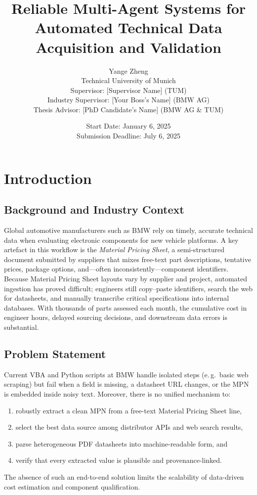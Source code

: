 \documentclass[11pt]{article}
\title{\textbf{Reliable Multi-Agent Systems for Automated Technical Data Acquisition and Validation}}
\author{
  Yange Zheng \\
  Technical University of Munich \\
  Supervisor: [Supervisor Name] (TUM) \\
  Industry Supervisor: [Your Boss's Name] (BMW AG) \\
  Thesis Advisor: [PhD Candidate's Name] (BMW AG \& TUM)
}
\date{Start Date: January 6, 2025 \\
Submission Deadline: July 6, 2025}
\begin{document}
\maketitle

\tableofcontents
\newpage

\section{Introduction}

\subsection{Background and Industry Context}
Global automotive manufacturers such as BMW rely on timely, accurate technical data when evaluating electronic components for new vehicle platforms.  
A key artefact in this workflow is the \emph{Material Pricing Sheet}, a semi-structured document submitted by suppliers that mixes free-text part descriptions, tentative prices, package options, and—often inconsistently—component identifiers.  
Because Material Pricing Sheet layouts vary by supplier and project, automated ingestion has proved difficult; engineers still copy–paste identifiers, search the web for datasheets, and manually transcribe critical specifications into internal databases.  
With thousands of parts assessed each month, the cumulative cost in engineer hours, delayed sourcing decisions, and downstream data errors is substantial.

\subsection{Problem Statement}
Current VBA and Python scripts at BMW handle isolated steps (e.\,g.\ basic web scraping) but fail when a field is missing, a datasheet URL changes, or the MPN is embedded inside noisy text.  
Moreover, there is no unified mechanism to:  
\begin{enumerate}
  \item robustly extract a clean MPN from a free-text Material Pricing Sheet line,
  \item select the best data source among distributor APIs and web search results,
  \item parse heterogeneous PDF datasheets into machine-readable form, and
  \item verify that every extracted value is plausible and provenance-linked.
\end{enumerate}
The absence of such an end-to-end solution limits the scalability of data-driven cost estimation and component qualification.
\end{document}
